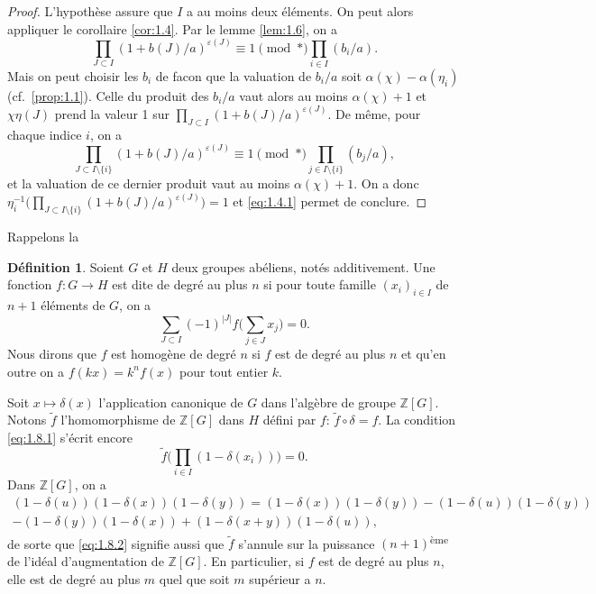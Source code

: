 \documentclass[12pt,a4paper]{article}
\theoremstyle{plain}
\theoremstyle{definition}
\newtheorem{definition}[theorem]{D\'efinition}
\theoremstyle{remark}
\newcommand{\bZ}{\mathbb{Z}}
\begin{document}
\begin{proof}
L'hypoth\`ese assure que $I$ a au moins deux \'el\'ements. On peut alors appliquer le corollaire \ref{cor:1.4}. Par le lemme \ref{lem:1.6}, on a
\[
\prod_{J \subset I} (1+b(J)/a)^{\varepsilon(J)} \equiv 1 \pmod{*} \prod_{i \in I} (b_i/a).
\]
Mais on peut choisir les $b_i$ de facon que la valuation de $b_i/a$ soit $\alpha(\chi) - \alpha(\eta_i)$ (cf.~\ref{prop:1.1}). Celle du produit des $b_i/a$ vaut alors au moins $\alpha(\chi)+1$ et $\chi\eta(J)$ prend la valeur 1 sur $\prod_{J \subset I}(1+b(J)/a)^{\varepsilon(J)}$. De m\^eme, pour chaque indice $i$, on a
\[
\prod_{J \subset I \setminus \{i\}} (1+b(J)/a)^{\varepsilon(J)} \equiv 1 \pmod{*} \prod_{j \in I \setminus \{i\}} (b_j/a),
\]
et la valuation de ce dernier produit vaut au moins $\alpha(\chi) + 1$. On a donc $\eta_i^{-1}\bigl(\prod_{J \subset I \setminus \{i\}}(1+b(J)/a)^{\varepsilon(J)}\bigr) = 1$ et \eqref{eq:1.4.1} permet de conclure.
\end{proof}

Rappelons la

\begin{definition}\label{def:1.8}
Soient $G$ et $H$ deux groupes ab\'eliens, not\'es additivement. Une fonction $f: G \to H$ est dite de degr\'e au plus $n$ si pour toute famille $(x_i)_{i \in I}$ de $n+1$ \'el\'ements de $G$, on a
\begin{equation}\label{eq:1.8.1}
\sum_{J \subset I} (-1)^{|J|} f\biggl(\sum_{j \in J} x_j\biggr) = 0.
\end{equation}
Nous dirons que $f$ est homog\`ene de degr\'e $n$ si $f$ est de degr\'e au plus $n$ et qu'en outre on a $f(kx) = k^n f(x)$ pour tout entier $k$.
\end{definition}

Soit $x \mapsto \delta(x)$ l'application canonique de $G$ dans l'alg\`ebre de groupe $\bZ[G]$. Notons $\tilde{f}$ l'homomorphisme de $\bZ[G]$ dans $H$ d\'efini par $f$: $\tilde{f} \circ \delta = f$. La condition \eqref{eq:1.8.1} s'\'ecrit encore
\begin{equation}\label{eq:1.8.2}
\tilde{f}\biggl(\prod_{i \in I}(1-\delta(x_i))\biggr) = 0.
\end{equation}
Dans $\bZ[G]$, on a
\begin{multline*}
(1-\delta(u))(1-\delta(x))(1-\delta(y)) = (1-\delta(x))(1-\delta(y)) - (1-\delta(u))(1-\delta(y)) \\
- (1-\delta(y))(1-\delta(x)) + (1-\delta(x+y))(1-\delta(u)),
\end{multline*}
de sorte que \eqref{eq:1.8.2} signifie aussi que $\tilde{f}$ s'annule sur la puissance $(n+1)$\textsuperscript{\`eme} de l'id\'eal d'augmentation de $\bZ[G]$. En particulier, si $f$ est de degr\'e au plus $n$, elle est de degr\'e au plus $m$ quel que soit $m$ sup\'erieur a $n$.
\end{document}
